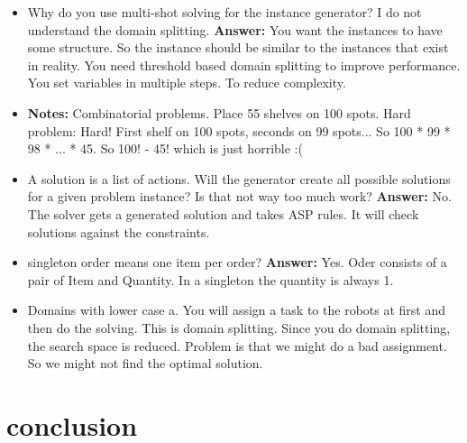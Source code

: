 \documentclass[runningheads]{llncs}
\begin{document}
\begin{itemize}
    \item Why do you use multi-shot solving for the instance generator? I do not understand the domain splitting. \textbf{Answer:} You want the instances to have some structure. So the instance should be similar to the instances that exist in reality. You need threshold based domain splitting to improve performance. You set variables in multiple steps. To reduce complexity. 
    \item \textbf{Notes:} Combinatorial problems. Place 55 shelves on 100 spots. Hard problem: Hard! First shelf on 100 spots, seconds on 99 spots... So 100 * 99 * 98 * ... * 45. So 100! - 45! which is just horrible :( 
    \item A solution is a list of actions. Will the generator create all possible solutions for a given problem instance? Is that not way too much work? \textbf{Answer:} No. The solver gets a generated solution and takes ASP rules. It will check solutions against the constraints.
    \item singleton order means one item per order? \textbf{Answer:} Yes. Oder consists of a pair of Item and Quantity. In a singleton the quantity is always 1.  
    \item Domains with lower case a. You will assign a task to the robots at first and then do the solving. This is domain splitting. Since you do domain splitting, the search space is reduced. Problem is that we might do a bad assignment. So we might not find the optimal solution. 
\end{itemize}



\section{conclusion}



\end{document}
